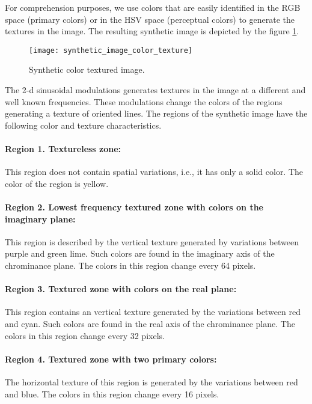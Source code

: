For comprehension purposes, we use colors that are easily identified in the RGB space (primary colors) or in the HSV space (perceptual colors) to generate the textures in the image. The resulting synthetic image is depicted by the figure \ref{fig:synthetic_color_texture_image}.

\begin{figure}[!ht]
    \texttt{[image: synthetic\_image\_color\_texture]}
\caption{Synthetic color textured image.}\label{fig:synthetic_color_texture_image}
\end{figure}

The 2-d sinusoidal modulations generates textures in the image at a different and well known frequencies. These modulations change the colors of the regions generating a texture of oriented lines. The regions of the synthetic image have the following color and texture characteristics.

\paragraph{Region 1. Textureless zone:}
This region does not contain spatial variations, i.e., it has only a solid color. The color of the region is yellow.

\paragraph{Region 2. Lowest frequency textured zone with colors on the imaginary plane:}
This region is described by the vertical texture generated by variations between purple and green lime. Such colors are found in the imaginary axis of the chrominance plane. The colors in this region change every 64 pixels.

\paragraph{Region 3. Textured zone with colors on the real plane:}
This region contains an vertical texture generated by the variations between red and cyan. Such colors are found in the real axis of the chrominance plane. The colors in this region change every 32 pixels.

\paragraph{Region 4. Textured zone with two primary colors:}
The horizontal texture of this region is generated by the variations between red and blue. The colors in this region change every 16 pixels. 

